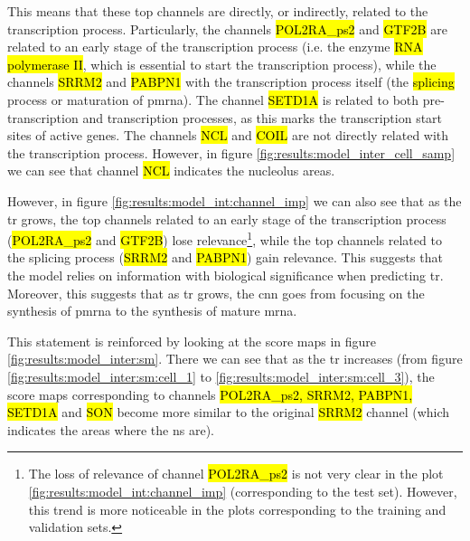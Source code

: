 This means that these top channels are directly, or indirectly, related to the transcription process. Particularly, the channels \hl{POL2RA\_ps2} and \hl{GTF2B} are related to an early stage of the transcription process (i.e. the enzyme \hl{RNA polymerase II}, which is essential to start the transcription process), while the channels \hl{SRRM2} and \hl{PABPN1} with the transcription process itself (the \hl{splicing} process or maturation of \gls{pmrna}). The channel \hl{SETD1A} is related to both pre-transcription and transcription processes, as this marks the transcription start sites of active genes. The channels \hl{NCL} and \hl{COIL} are not directly related with the transcription process. However, in figure \ref{fig:results:model_inter_cell_samp} we can see that channel \hl{NCL} indicates the nucleolus areas.

However, in figure \ref{fig:results:model_int:channel_imp} we can also see that as the \gls{tr} grows, the top channels related to an early stage of the transcription process (\hl{POL2RA\_ps2} and \hl{GTF2B}) lose relevance\footnote{The loss of relevance of channel \hl{POL2RA\_ps2} is not very clear in the plot \ref{fig:results:model_int:channel_imp} (corresponding to the test set). However, this trend is more noticeable in the plots corresponding to the training and validation sets.}, while the top channels related to the splicing process (\hl{SRRM2} and \hl{PABPN1}) gain relevance.
This suggests that the model relies on information with biological significance when predicting \gls{tr}. Moreover, this suggests that as \gls{tr} grows, the \gls{cnn} goes from focusing on the synthesis of \gls{pmrna} to the synthesis of mature \gls{mrna}.

This statement is reinforced by looking at the score maps in figure \ref{fig:results:model_inter:sm}.
There we can see that as the \gls{tr} increases (from figure \ref{fig:results:model_inter:sm:cell_1} to \ref{fig:results:model_inter:sm:cell_3}), the score maps corresponding to channels \hl{POL2RA\_ps2, SRRM2, PABPN1, SETD1A} and \hl{SON} become more similar to the original \hl{SRRM2} channel (which indicates the areas where the \gls{ns} are).
